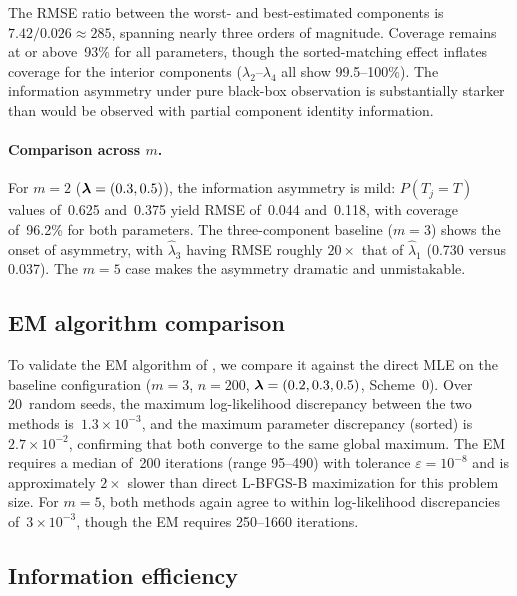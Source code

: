 The RMSE ratio between the worst- and best-estimated components is
$7.42 / 0.026 \approx 285$, spanning nearly three orders of magnitude.
Coverage remains at or above~93\% for all parameters, though
the sorted-matching effect inflates coverage for the interior components
($\lambda_2$--$\lambda_4$ all show 99.5--100\%).  The information
asymmetry under pure black-box observation is substantially starker
than would be observed with partial component identity information.

\paragraph{Comparison across $m$.}
For $m = 2$ ($\boldsymbol{\lambda} = (0.3, 0.5)$), the information asymmetry is mild:
$P(T_j = T)$ values of~0.625 and~0.375 yield RMSE of~0.044 and~0.118,
with coverage of~96.2\% for both parameters.  The three-component
baseline ($m = 3$) shows the onset of asymmetry, with $\hat{\lambda}_3$
having RMSE roughly $20\times$ that of $\hat{\lambda}_1$ (0.730 versus
0.037).  The $m = 5$ case makes the asymmetry dramatic and
unmistakable.


\subsection{EM algorithm comparison}
\label{sec:sim-em}

To validate the EM algorithm of , we compare
it against the direct MLE on the baseline configuration ($m = 3$,
$n = 200$, $\boldsymbol{\lambda} = (0.2, 0.3, 0.5)$, Scheme~0).  Over 20~random
seeds, the maximum log-likelihood discrepancy between the two methods
is~$1.3 \times 10^{-3}$, and the maximum parameter discrepancy
(sorted) is~$2.7 \times 10^{-2}$, confirming that both converge to the
same global maximum.  The EM requires a median of~200 iterations
(range 95--490) with tolerance $\varepsilon = 10^{-8}$ and is
approximately $2\times$ slower than direct L-BFGS-B maximization for
this problem size.  For $m = 5$, both methods again agree to within
log-likelihood discrepancies of~$3 \times 10^{-3}$, though the EM
requires 250--1660 iterations.


\subsection{Information efficiency}
\label{sec:sim-fisher}

